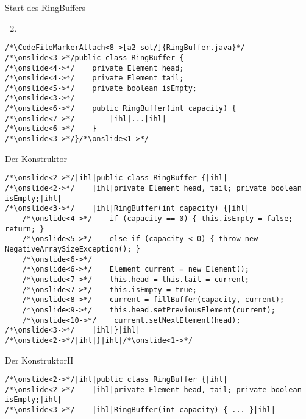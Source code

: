 {\begin{frame}[fragile]{Start des RingBuffers}
\begin{enumerate}[<+(1)->]
    \setcounter{enumi}{1}
    \item {}
\end{enumerate}
\SetupLstHl
\begin{verbatim}
/*\CodeFileMarkerAttach<8->[a2-sol/]{RingBuffer.java}*/
/*\onslide<3->*/public class RingBuffer {
/*\onslide<4->*/    private Element head;
/*\onslide<4->*/    private Element tail;
/*\onslide<5->*/    private boolean isEmpty;
/*\onslide<3->*/
/*\onslide<6->*/    public RingBuffer(int capacity) {
/*\onslide<7->*/        |ihl|...|ihl|
/*\onslide<6->*/    }
/*\onslide<3->*/}/*\onslide<1->*/
\end{verbatim}
\end{frame}
\begin{frame}[fragile]{Der Konstruktor}
\SetupLstHl
\begin{verbatim}
/*\onslide<2->*/|ihl|public class RingBuffer {|ihl|
/*\onslide<2->*/    |ihl|private Element head, tail; private boolean isEmpty;|ihl|
/*\onslide<3->*/    |ihl|RingBuffer(int capacity) {|ihl|
    /*\onslide<4->*/    if (capacity == 0) { this.isEmpty = false; return; }
    /*\onslide<5->*/    else if (capacity < 0) { throw new NegativeArraySizeException(); }
    /*\onslide<6->*/
    /*\onslide<6->*/    Element current = new Element();
    /*\onslide<7->*/    this.head = this.tail = current;
    /*\onslide<7->*/    this.isEmpty = true;
    /*\onslide<8->*/    current = fillBuffer(capacity, current);
    /*\onslide<9->*/    this.head.setPreviousElement(current);
    /*\onslide<10->*/    current.setNextElement(head);
/*\onslide<3->*/    |ihl|}|ihl|
/*\onslide<2->*/|ihl|}|ihl|/*\onslide<1->*/
\end{verbatim}
\end{frame}

\begin{frame}[fragile,c]{Der Konstruktor\hfill II}
\SetupLstHl{}
\begin{verbatim}
/*\onslide<2->*/|ihl|public class RingBuffer {|ihl|
/*\onslide<2->*/    |ihl|private Element head, tail; private boolean isEmpty;|ihl|
/*\onslide<3->*/    |ihl|RingBuffer(int capacity) { ... }|ihl|


\end{verbatim}
\end{frame}}
